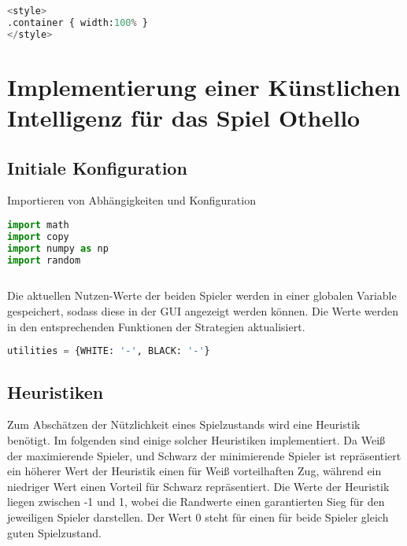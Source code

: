 \begin{lstlisting}[language=Python]
%%HTML
<style>
.container { width:100% }
</style>
\end{lstlisting}

\hypertarget{implementierung-einer-kuxfcnstlichen-intelligenz-fuxfcr-das-spiel-othello}{%
\section{Implementierung einer Künstlichen Intelligenz für das Spiel
Othello}\label{implementierung-einer-kuxfcnstlichen-intelligenz-fuxfcr-das-spiel-othello}}

\hypertarget{initiale-konfiguration}{%
\subsection{Initiale Konfiguration}\label{initiale-konfiguration}}

Importieren von Abhängigkeiten und Konfiguration

\begin{lstlisting}[language=Python]
import math
import copy
import numpy as np
import random
\end{lstlisting}

\begin{lstlisting}[language=Python]
%run othello_game.ipynb
\end{lstlisting}

Die aktuellen Nutzen-Werte der beiden Spieler werden in einer globalen
Variable gespeichert, sodass diese in der GUI angezeigt werden können.
Die Werte werden in den entsprechenden Funktionen der Strategien
aktualisiert.

\begin{lstlisting}[language=Python]
utilities = {WHITE: '-', BLACK: '-'}
\end{lstlisting}

\hypertarget{heuristiken}{%
\subsection{Heuristiken}\label{heuristiken}}

Zum Abschätzen der Nützlichkeit eines Spielzustands wird eine Heuristik
benötigt. Im folgenden sind einige solcher Heuristiken implementiert. Da
Weiß der maximierende Spieler, und Schwarz der minimierende Spieler ist
repräsentiert ein höherer Wert der Heuristik einen für Weiß
vorteilhaften Zug, während ein niedriger Wert einen Vorteil für Schwarz
repräsentiert. Die Werte der Heuristik liegen zwischen -1 und 1, wobei
die Randwerte einen garantierten Sieg für den jeweiligen Spieler
darstellen. Der Wert 0 steht für einen für beide Spieler gleich guten
Spielzustand.

